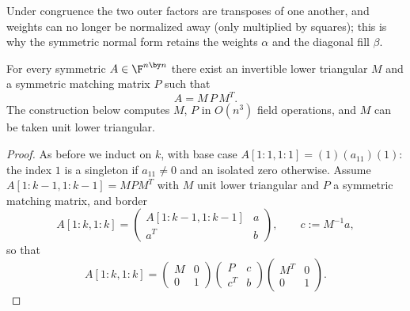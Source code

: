 Under congruence the two outer factors are transposes of one another, and
weights can no longer be normalized away (only multiplied by squares); this
is why the symmetric normal form retains the weights $\alpha$ and the
diagonal fill $\beta$.

\begin{lemma}\label{lem:reduction-sym}
  For every symmetric $A \in \F^{n \by n}$ there exist an invertible lower
  triangular $M$ and a symmetric matching matrix $P$ such that
  \[
    A = M \, P \, M^T .
  \]
  The construction below computes $M$, $P$ in $O(n^3)$ field operations,
  and $M$ can be taken unit lower triangular.
\end{lemma}

\begin{proof}
  As before we induct on $k$, with base case
  $A[1:1,1:1] = (1)(a_{11})(1)$: the index $1$ is a singleton if
  $a_{11} \neq 0$ and an isolated zero otherwise.  Assume
  $A[1:k-1,1:k-1] = M P M^T$ with $M$ unit lower triangular and $P$ a
  symmetric matching matrix, and border
  \[
    A[1:k,1:k] =
    \begin{pmatrix}
      A[1:k-1,1:k-1] & a\\
      a^T & b
    \end{pmatrix},
    \qquad
    c := M^{-1} a,
  \]
  so that
  \begin{equation}\label{eq:border-sym}
    A[1:k,1:k] =
    \begin{pmatrix}
      M & 0\\
      0 & 1
    \end{pmatrix}
    \begin{pmatrix}
      P & c\\
      c^T & b
    \end{pmatrix}
    \begin{pmatrix}
      M^T & 0\\
      0 & 1
    \end{pmatrix}.
  \end{equation}


\end{proof}
